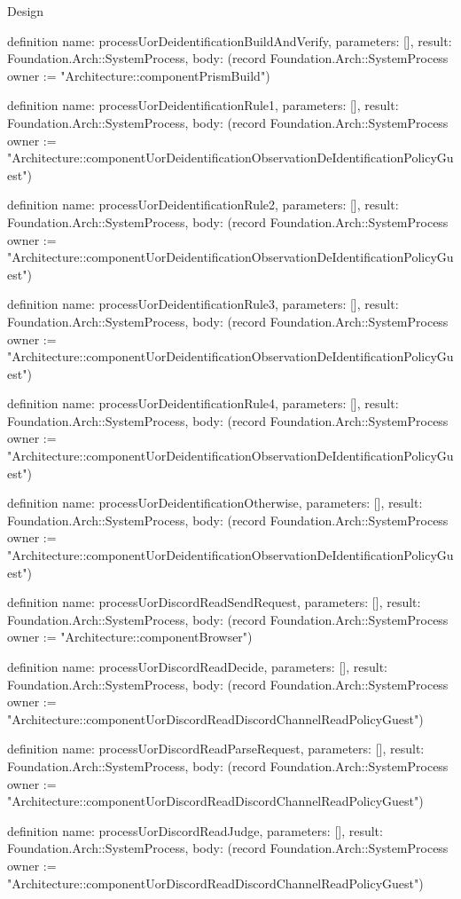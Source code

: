 \begin{lexlean}{Design}
\begin{semanticmodule}
definition{
  name: processUorDeidentificationBuildAndVerify,
  parameters: [],
  result: Foundation.Arch::SystemProcess,
  body: (record Foundation.Arch::SystemProcess {owner := "Architecture::componentPrismBuild"})
}

definition{
  name: processUorDeidentificationRule1,
  parameters: [],
  result: Foundation.Arch::SystemProcess,
  body: (record Foundation.Arch::SystemProcess {owner := "Architecture::componentUorDeidentificationObservationDeIdentificationPolicyGuest"})
}

definition{
  name: processUorDeidentificationRule2,
  parameters: [],
  result: Foundation.Arch::SystemProcess,
  body: (record Foundation.Arch::SystemProcess {owner := "Architecture::componentUorDeidentificationObservationDeIdentificationPolicyGuest"})
}

definition{
  name: processUorDeidentificationRule3,
  parameters: [],
  result: Foundation.Arch::SystemProcess,
  body: (record Foundation.Arch::SystemProcess {owner := "Architecture::componentUorDeidentificationObservationDeIdentificationPolicyGuest"})
}

definition{
  name: processUorDeidentificationRule4,
  parameters: [],
  result: Foundation.Arch::SystemProcess,
  body: (record Foundation.Arch::SystemProcess {owner := "Architecture::componentUorDeidentificationObservationDeIdentificationPolicyGuest"})
}

definition{
  name: processUorDeidentificationOtherwise,
  parameters: [],
  result: Foundation.Arch::SystemProcess,
  body: (record Foundation.Arch::SystemProcess {owner := "Architecture::componentUorDeidentificationObservationDeIdentificationPolicyGuest"})
}

definition{
  name: processUorDiscordReadSendRequest,
  parameters: [],
  result: Foundation.Arch::SystemProcess,
  body: (record Foundation.Arch::SystemProcess {owner := "Architecture::componentBrowser"})
}

definition{
  name: processUorDiscordReadDecide,
  parameters: [],
  result: Foundation.Arch::SystemProcess,
  body: (record Foundation.Arch::SystemProcess {owner := "Architecture::componentUorDiscordReadDiscordChannelReadPolicyGuest"})
}

definition{
  name: processUorDiscordReadParseRequest,
  parameters: [],
  result: Foundation.Arch::SystemProcess,
  body: (record Foundation.Arch::SystemProcess {owner := "Architecture::componentUorDiscordReadDiscordChannelReadPolicyGuest"})
}

definition{
  name: processUorDiscordReadJudge,
  parameters: [],
  result: Foundation.Arch::SystemProcess,
  body: (record Foundation.Arch::SystemProcess {owner := "Architecture::componentUorDiscordReadDiscordChannelReadPolicyGuest"})
}


\end{semanticmodule}
\end{lexlean}
